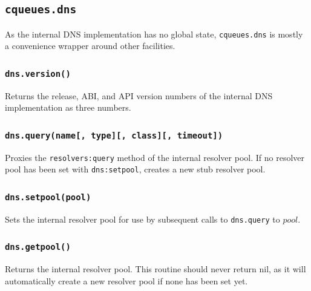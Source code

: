\documentclass[11pt, oneside]{memoir}
\newcommand*{\fn}[1]{\texttt{#1}\xspace}
\newcommand*{\module}[1]{\texttt{#1}\xspace}
\newcounter{toccols}
\newenvironment{Module}[1]{
	\subsection{\texttt{#1}}
	\addtocontents{toc}{
		\protect\begin{multicols}{\value{toccols}}
	}
}{
	\addtocontents{toc}{\protect\end{multicols}}
}
\begin{document}
\begin{Module}{cqueues.dns}

As the internal DNS implementation has no global state, \module{cqueues.dns} is mostly a convenience wrapper around other facilities.

\subsubsection[\fn{dns.version}]{\fn{dns.version()}}

Returns the release, ABI, and API version numbers of the internal DNS implementation as three numbers.

\subsubsection[\fn{dns.query}]{\fn{dns.query(name[, type][, class][, timeout])}}

Proxies the \fn{resolvers:query} method of the internal resolver pool. If no resolver pool has been set with \fn{dns:setpool}, creates a new stub resolver pool.

\subsubsection[\fn{dns.setpool}]{\fn{dns.setpool(pool)}}

Sets the internal resolver pool for use by subsequent calls to \fn{dns.query} to $pool$.

\subsubsection[\fn{dns.getpool}]{\fn{dns.getpool()}}

Returns the internal resolver pool. This routine should never return nil, as it will automatically
create a new resolver pool if none has been set yet.

\end{Module}
\end{document}
